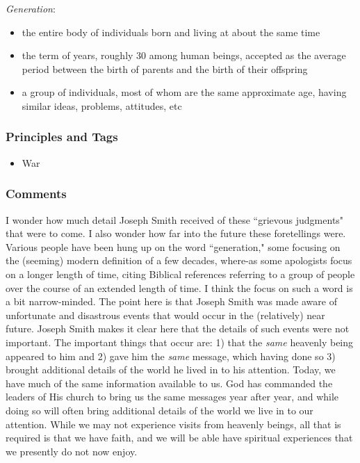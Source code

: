 \documentclass[12pt]{report}
\begin{document}
\emph{Generation}: \begin{itemize}
\item the entire body of individuals born and living at about the same time
\item the term of years, roughly 30 among human beings, accepted as the average period between the birth of parents and the birth of their offspring
\item a group of individuals, most of whom are the same approximate age, having similar ideas, problems, attitudes, etc
\end{itemize}

\subsubsection{Principles and Tags\label{js:principles12}}
\begin{itemize}
\item {}War
\end{itemize}

\subsubsection{Comments\label{js:comments12}}
I wonder how much detail Joseph Smith received of these ``grievous judgments" that were to come.  I also wonder how far into the future these foretellings were.  Various people have been hung up on the word ``generation," some focusing on the (seeming) modern definition of a few decades, where-as some apologists focus on a longer length of time, citing Biblical references referring to a group of people over the course of an extended length of time.  I think the focus on such a word is a bit narrow-minded.  The point here is that Joseph Smith was made aware of unfortunate and disastrous events that would occur in the (relatively) near future.  Joseph Smith makes it clear here that the details of such events were not important.  The important things that occur are: 1) that the \emph{same} heavenly being appeared to him and 2) gave him the \emph{same} message, which having done so 3) brought additional details of the world he lived in to his attention.  Today, we have much of the same information available to us.  God has commanded the leaders of His church to bring us the same messages year after year, and while doing so will often bring additional details of the world we live in to our attention.  While we may not experience visits from heavenly beings, all that is required is that we have faith, and we will be able have spiritual experiences that we presently do not now enjoy.
\end{document}
